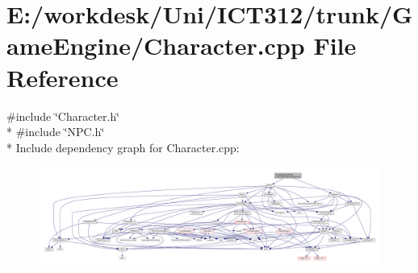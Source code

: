 \section{E\+:/workdesk/\+Uni/\+I\+C\+T312/trunk/\+Game\+Engine/\+Character.cpp File Reference}
\label{_character_8cpp}
{\ttfamily \#include \char`\"{}Character.\+h\char`\"{}}\\*
{\ttfamily \#include \char`\"{}N\+P\+C.\+h\char`\"{}}\\*
Include dependency graph for Character.\+cpp\+:
\nopagebreak
\begin{figure}[H]
\begin{center}
\leavevmode
\includegraphics[width=350pt]{d1/d16/_character_8cpp__incl}
\end{center}
\end{figure}
